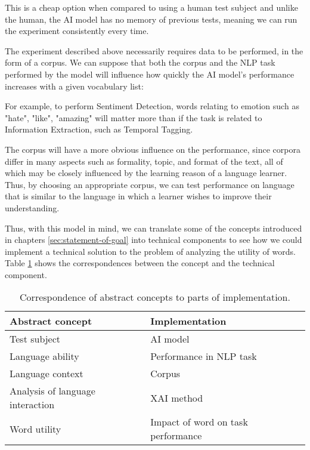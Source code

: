 This is a cheap option when compared to using a human test subject and unlike the human, the AI model has no memory of previous tests, meaning we can run the experiment consistently every time.

The experiment described above necessarily requires data to be performed, in the form of a corpus.
We can suppose that both the corpus and the NLP task performed by the model will influence how quickly the AI model's performance increases with a given vocabulary list:

For example, to perform Sentiment Detection, words relating to emotion such as "hate", "like", "amazing" will matter more than if the task is related to Information Extraction, such as Temporal Tagging.

The corpus will have a more obvious influence on the performance, since corpora differ in many aspects such as formality, topic, and format of the text, all of which may be closely influenced by the learning reason of a language learner.
Thus, by choosing an appropriate corpus, we can test performance on language that is similar to the language in which a learner wishes to improve their understanding.



Thus, with this model in mind, we can translate some of the concepts introduced in chapters \ref{sec:statement-of-goal} into technical components to see how we could implement a technical solution to the problem of analyzing the utility of words.
Table \ref{table:concept-implementation-correspondence} shows the correspondences between the concept and the technical component.

\begin{table}[ht]
	\centering
	\begin{tabularx}{\textwidth}{|X|X|}
		\hline
		\textbf{Abstract concept}        & \textbf{Implementation}            \\
		\hline
		Test subject                     & AI model                           \\
		\hline
		Language ability                 & Performance in NLP task            \\
		\hline
		Language context                 & Corpus                             \\
		\hline
		Analysis of language interaction & XAI method                         \\
		\hline
		Word utility                     & Impact of word on task performance \\
		\hline
	\end{tabularx}
	\caption{Correspondence of abstract concepts to parts of implementation.}
	\label{table:concept-implementation-correspondence}
\end{table}


